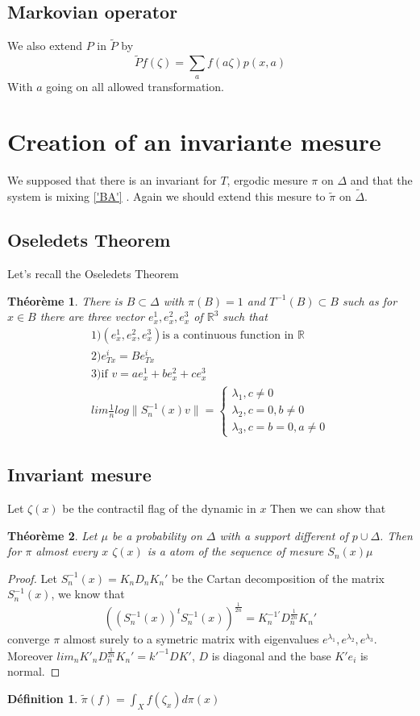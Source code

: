 \documentclass[12pt]{article}
\theoremstyle{plain}%
\newtheorem{thm}{Théorème}[section]
\theoremstyle{definition}
\newtheorem{dfnt}{Définition}[section]
\theoremstyle{remark}
\begin{document}
\subsection{Markovian operator}
We also extend $P$ in $\tilde{P}$ by \[
\tilde{P}f(\zeta)=\sum_a f(a \zeta) p(x,a)
\]
With $a$ going on all allowed transformation.

\section{Creation of an invariante mesure}
We supposed that there is an invariant for $T$, ergodic mesure $\pi$ on $\Delta$ and that the system is mixing \ref{'BA'} %
. Again we should extend this mesure to $\tilde{\pi}$ on $\tilde{\Delta}$.\newline
\subsection{Oseledets Theorem}
Let's recall the Oseledets Theorem
\begin{thm}
There is $B \subset \Delta$ with $\pi(B)=1$ and $T^{-1}(B) \subset B$ such as for  $x\in B$ there are three vector $e^1_x,e^2_x,e^3_x$ of $\mathbb{R}^3$ such that \[
\begin{matrix}
1)(e^1_x,e^2_x,e^3_x)\text{is a continuous function in } \mathbb{R} \\
2)e^i_{Tx}=Be^i_{Tx} \\
3)\text{if }v=ae^1_x+be^2_x+ce^3_x\\
lim \frac{1}{n}log \|S_n^{-1}(x)v\|=
\left \{ \begin{matrix}
\lambda_1,c \ne 0\\
\lambda_2,c=0,b \ne 0 \\
\lambda_3,c=b=0,a\ne 0
\end{matrix}
\right .
\end{matrix}
\]
\end{thm}
\subsection{Invariant mesure}
Let $\zeta(x)$ be the contractil flag of the dynamic in $x$\newline
Then we can show that
\begin{thm}
Let $\mu$ be a probability on $\Delta$ with a support different of $p \cup \Delta$. Then for $\pi$ almost every $x$ $\zeta(x)$ is a atom of the sequence of mesure $S_n(x)\mu$
\end{thm}
\begin{proof}
Let $S_n^{-1}(x)=K_n D_n K_n'$ be the Cartan decomposition of the matrix $S_n^{-1}(x)$, we know that \[
((S_n^{-1}(x))^{t}
 S_n^{-1}(x))^{\frac{1}{2n}} =
 K_n^{-1'}
 D_n^{\frac{1}{2n}}
 K_n'
\]
converge $\pi$ almost surely to a symetric matrix with eigenvalues $e^{\lambda_1},e^{\lambda_2},e^{\lambda_3}$. Moreover $lim_n K'_n D_n^{\frac{1}{2n}} K_n'=k'^{-1}D K'$, $D$ is diagonal and the base $K' e_i$ is normal.
\end{proof}
\begin{dfnt}
$\tilde{\pi}(f)=\int_X f(\zeta_x) d \pi(x)$
\end{dfnt}
\end{document}
